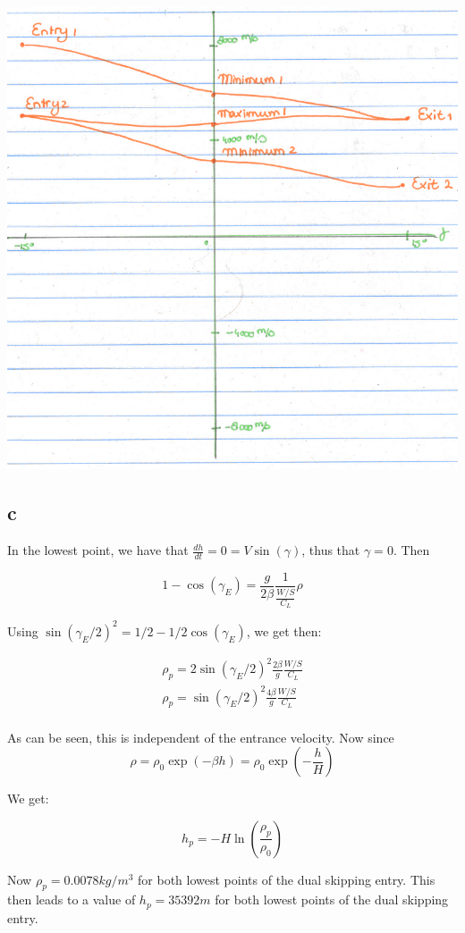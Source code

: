 \includegraphics[scale = 1]{SkippingFlight.PNG}

\subsection*{c}
In the lowest point, we have that $\frac{dh}{dt} = 0 = V \sin{(\gamma)}$, thus that $\gamma =0$. Then 

\begin{equation}
        1 - \cos{(\gamma_E)} =  \frac{g}{2 \beta} \frac{1}{\frac{W/S}{C_L}} \rho 
\end{equation}

Using $\sin{(\gamma_E/2)}^2 = 1/2 - 1/2 \cos{(\gamma_E)}$, we get then:

\begin{equation}
    \begin{split}
        \rho_p = 2 \sin{(\gamma_E/2)}^2 \frac{2 \beta}{g} \frac{W/S}{C_L} \\
        \rho_p = \sin{(\gamma_E/2)}^2 \frac{4 \beta}{g} \frac{W/S}{C_L} \\
    \end{split}
\end{equation}

As can be seen, this is independent of the entrance velocity. Now since 
\begin{equation}
    \rho = \rho_0 \exp{(-\beta h)} = \rho_0 \exp{(-\frac{ h}{H})}
\end{equation}

We get:

\begin{equation}
    h_p = -H \ln{(\frac{\rho_p}{\rho_0})}
\end{equation}

Now $\rho_p = 0.0078 kg/m^3$ for both lowest points of the dual skipping entry. This then leads to a value of $h_p = 35392 m$ for both lowest points of the dual skipping entry. 

